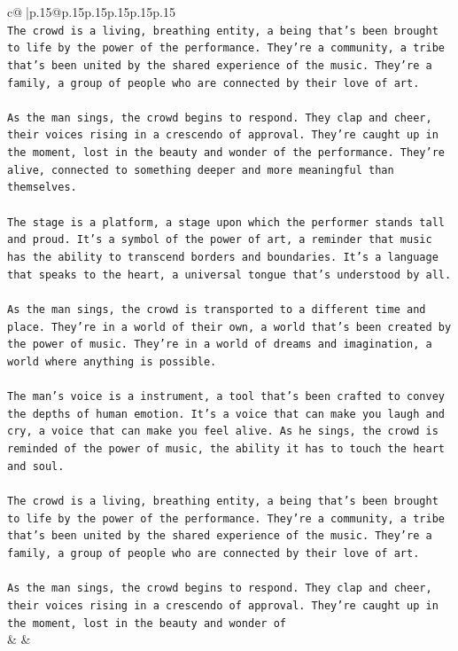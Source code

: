\documentclass{article}
\begin{document}
{\begin{supertabular}{c@{$\;$}|p{.15\linewidth}@{}p{.15\linewidth}p{.15\linewidth}p{.15\linewidth}p{.15\linewidth}p{.15\linewidth}}
{{{\\ 
\texttt{The crowd is a living, breathing entity, a being that's been brought to life by the power of the performance. They're a community, a tribe that's been united by the shared experience of the music. They're a family, a group of people who are connected by their love of art.} \\
\\ 
\texttt{As the man sings, the crowd begins to respond. They clap and cheer, their voices rising in a crescendo of approval. They're caught up in the moment, lost in the beauty and wonder of the performance. They're alive, connected to something deeper and more meaningful than themselves.} \\
\\ 
\texttt{The stage is a platform, a stage upon which the performer stands tall and proud. It's a symbol of the power of art, a reminder that music has the ability to transcend borders and boundaries. It's a language that speaks to the heart, a universal tongue that's understood by all.} \\
\\ 
\texttt{As the man sings, the crowd is transported to a different time and place. They're in a world of their own, a world that's been created by the power of music. They're in a world of dreams and imagination, a world where anything is possible.} \\
\\ 
\texttt{The man's voice is a instrument, a tool that's been crafted to convey the depths of human emotion. It's a voice that can make you laugh and cry, a voice that can make you feel alive. As he sings, the crowd is reminded of the power of music, the ability it has to touch the heart and soul.} \\
\\ 
\texttt{The crowd is a living, breathing entity, a being that's been brought to life by the power of the performance. They're a community, a tribe that's been united by the shared experience of the music. They're a family, a group of people who are connected by their love of art.} \\
\\ 
\texttt{As the man sings, the crowd begins to respond. They clap and cheer, their voices rising in a crescendo of approval. They're caught up in the moment, lost in the beauty and wonder of} \\
            }
        }
    }
    & & \\ \\


\end{supertabular}}
\end{document}
